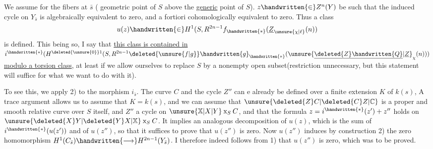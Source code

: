 We assume   for the fibers at $\bar s$ ( geometric point of $S$ above the \uline{generic} point of $S$).    $z\handwritten{\in}Z^n(Y)$ be such that the induced cycle on $Y_{\bar s}$ is algebraically equivalent to zero, and a fortiori cohomologically equivalent to zero. Thus a class
\[
u(z)\handwritten{\in}H^1(S,R^{2n-1}f_{\handwritten{*}}(\underline{Z}_{\unsure{\chi|\ell}}(n))
\]
is defined. This being so, I say that \uline{this class is  contained in} $i^{\handwritten{*}}(H^{\deleted{\unsure{0}}1}(S,R^{2n-1}\deleted{\unsure{f|g}}\handwritten{g}_{\handwritten{*}}(\unsure{\underline{\deleted{Z}\handwritten{Q}}|\underline{Z}}_{\chi}(n)))$ \uline{modulo a torsion class}, at least if we    allow ourselves to replace $S$ by a nonempty open subset(restriction  unnecessary, but this statement will suffice for what we want to do with it).

To see this, we apply 2) to the morphism $i_{\bar s}$. The curve $C$ and the cycle $Z''$ can e already be defined over a finite extension $K$ of $k(s)$, A trace argument allows us to assume that $K=k(s)$, and  we can assume that $\unsure{\deleted{Z}C|\deleted{C}Z|\mathbb{C}}$  is a proper and smooth relative curve over $S$ itself, and $Z''$ a cycle on $\unsure{\mathbb{X}|X|Y}\mathbin{\mathrm{x}}_S C$,  and that the formula $z=i^{\handwritten{*}}(z')+z''$ holds on $\unsure{\deleted{X}Y|\deleted{Y}X|\mathbb{X}}\mathbin{\mathrm{x}}_S C$. It implies an analogous decomposition of $u(z)$, which is the sum of $i^{\handwritten{*}}(u(z'))$ and of $u(z'')$, so that it suffices to prove that $u(z'')$ is zero. Now $u(z'')$ induces by construction 2) the zero homomorphism $H^1(C_{\bar s})\handwritten{\longrightarrow}H^{2n-1}(Y_{\bar s})$. I therefore indeed follows from 1) that $u(z'')$ is zero, which was to be proved.

